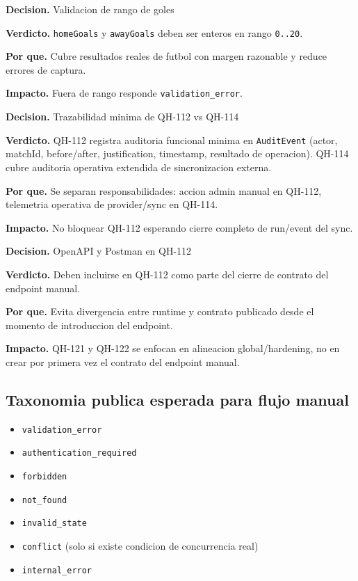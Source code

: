 \begin{docnote}
\textbf{Decision.} Validacion de rango de goles

\textbf{Verdicto.} \texttt{homeGoals} y \texttt{awayGoals} deben ser enteros en rango \texttt{0..20}.

\textbf{Por que.} Cubre resultados reales de futbol con margen razonable y reduce errores de captura.

\textbf{Impacto.} Fuera de rango responde \texttt{validation\_error}.
\end{docnote}

\begin{docnote}
\textbf{Decision.} Trazabilidad minima de QH-112 vs QH-114

\textbf{Verdicto.} QH-112 registra auditoria funcional minima en \texttt{AuditEvent} (actor, matchId, before/after, justification, timestamp, resultado de operacion). QH-114 cubre auditoria operativa extendida de sincronizacion externa.

\textbf{Por que.} Se separan responsabilidades: accion admin manual en QH-112, telemetria operativa de provider/sync en QH-114.

\textbf{Impacto.} No bloquear QH-112 esperando cierre completo de run/event del sync.
\end{docnote}

\begin{docnote}
\textbf{Decision.} OpenAPI y Postman en QH-112

\textbf{Verdicto.} Deben incluirse en QH-112 como parte del cierre de contrato del endpoint manual.

\textbf{Por que.} Evita divergencia entre runtime y contrato publicado desde el momento de introduccion del endpoint.

\textbf{Impacto.} QH-121 y QH-122 se enfocan en alineacion global/hardening, no en crear por primera vez el contrato del endpoint manual.
\end{docnote}

\subsection{Taxonomia publica esperada para flujo manual}

\begin{itemize}
  \item \texttt{validation\_error}
  \item \texttt{authentication\_required}
  \item \texttt{forbidden}
  \item \texttt{not\_found}
  \item \texttt{invalid\_state}
  \item \texttt{conflict} (solo si existe condicion de concurrencia real)
  \item \texttt{internal\_error}
\end{itemize}

